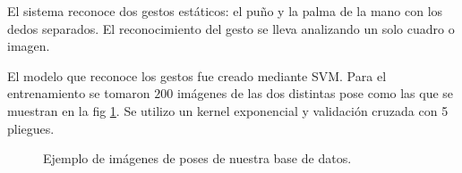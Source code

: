 El sistema reconoce dos gestos estáticos: el puño y la palma de la mano con los dedos separados. El reconocimiento del gesto se lleva analizando un solo cuadro o imagen.  

El modelo que reconoce los gestos fue creado mediante SVM. Para el entrenamiento se tomaron $200$ imágenes de las dos distintas pose como las que se muestran en la fig \ref{fig:SVMTrainingStatic}. Se utilizo un kernel exponencial y validación cruzada con 5 pliegues.   

\begin{figure}[h!]
\begin{center}
      \quad
{}
\end{center}
\caption{Ejemplo de imágenes de poses de nuestra base de datos.}
\label{fig:SVMTrainingStatic}
\end{figure}


